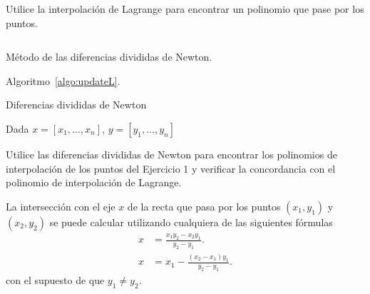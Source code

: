 \begin{questions}
    \question


    Utilice la interpolación de Lagrange para encontrar un polinomio que pase por los puntos.

    \begin{listing}[ht!]
        \tiny
        \centering
        \inputminted[linenos,highlightlines={7-25}]{octave}{newtdd.m}
        \caption{Método de las diferencias divididas de Newton.}
    \end{listing}

    Algoritmo~\ref{algo:updateL}.

    \begin{algorithm}[H]
        \caption{Diferencias divididas de Newton}\label{algo:updateL}
        Dada $x=\left[x_{1},\dotsc,x_{n}\right]$, $y=\left[y_{1},\dotsc,y_{n}\right]$\;
    \end{algorithm}

    \question

    Utilice las diferencias divididas de Newton para encontrar los
    polinomios de interpolación de los puntos del Ejercicio 1 y verificar la concordancia con el polinomio de interpolación de Lagrange.

    \question

    La intersección con el eje $x$ de la recta que pasa por los
    puntos $\left(x_{1},y_{1}\right)$ y $\left(x_{2},y_{2}\right)$ se
    puede calcular utilizando cualquiera de las siguientes fórmulas
    \begin{align*}
        x & =
        \frac{x_{1}y_{2}-x_{2}y_{1}}{y_{2}-y_{1}}. \\
        x & =
        x_{1}-
        \frac{\left(x_{2}-x_{1}\right)y_{1}}{y_{2}-y_{1}}.
    \end{align*}
    con el supuesto de que $y_{1}\neq y_{2}$.

\end{questions}
